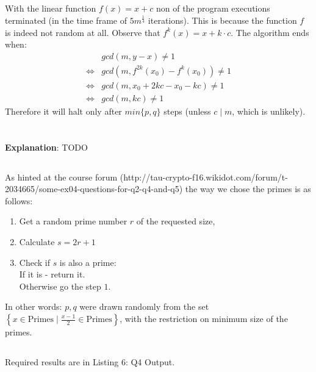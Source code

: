 \documentclass{article}
\begin{document}
\subsection{} %
With the linear function $f(x)=x+c$ non of the program executions terminated (in the time frame of $5 m^{\frac{1}{4}}$ iterations). This is because the function $f$ is indeed not random at all. Observe that
$f^k(x) = x + k \cdot c$. The algorithm ends when:
\begin{align*}
     & gcd(m, y - x) \neq 1 \\
\iff & gcd(m, f^{2k}(x_0) - f^{k}(x_0)) \neq 1 \\
\iff & gcd(m, x_0 + 2kc - x_0 - kc) \neq 1 \\
\iff & gcd(m, kc) \neq 1
\end{align*}
Therefore it will halt only after $min\{p,q\}$ steps (unless $c \mid m$, which is unlikely).

\section{} %

\pagebreak

\textbf{Explanation}: TODO
\subsection{} %
As hinted at the course forum (http://tau-crypto-f16.wikidot.com/forum/t-2034665/some-ex04-questions-for-q2-q4-and-q5) the way we chose the primes is as follows:
\begin{enumerate}
\item Get a random prime number $r$ of the requested size,
\item Calculate $s = 2r + 1$ 
\item Check if $s$ is also a prime:\\
 If it is - return it. \\
 Otherwise go the step $1$.
\end{enumerate}
In other words: $p, q$ were drawn randomly from the set $\left\{ x \in \mbox{Primes} \mid \frac{x-1}{2} \in \mbox{Primes} \right\}$, with the restriction on minimum size of the primes.

\subsection{} %
Required results are in Listing 6: Q4 Output.
\end{document}
